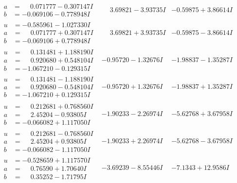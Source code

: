 \documentclass[1p]{elsarticle_modified}
\theoremstyle{definition}
\begin{document}
$$\begin{array}{c|c|c}
\begin{aligned}
a &= \phantom{-}0.071777 - 0.307147 I \\
b &= -0.069106 - 0.778948 I\end{aligned}
 & \phantom{-}3.69821 - 3.93735 I & -0.59875 + 3.86614 I \\ \hline\begin{aligned}
u &= -0.585961 - 1.027330 I \\
a &= \phantom{-}0.071777 + 0.307147 I \\
b &= -0.069106 + 0.778948 I\end{aligned}
 & \phantom{-}3.69821 + 3.93735 I & -0.59875 - 3.86614 I \\ \hline\begin{aligned}
u &= \phantom{-}0.131481 + 1.188190 I \\
a &= \phantom{-}0.920680 + 0.548104 I \\
b &= -1.067210 - 0.129315 I\end{aligned}
 & -0.95720 - 1.32676 I & -1.98837 - 1.35287 I \\ \hline\begin{aligned}
u &= \phantom{-}0.131481 - 1.188190 I \\
a &= \phantom{-}0.920680 - 0.548104 I \\
b &= -1.067210 + 0.129315 I\end{aligned}
 & -0.95720 + 1.32676 I & -1.98837 + 1.35287 I \\ \hline\begin{aligned}
u &= \phantom{-}0.212681 + 0.768560 I \\
a &= \phantom{-}2.45204 - 0.93805 I \\
b &= -0.066082 + 1.117050 I\end{aligned}
 & -1.90233 - 2.26974 I & -5.62768 + 3.67958 I \\ \hline\begin{aligned}
u &= \phantom{-}0.212681 - 0.768560 I \\
a &= \phantom{-}2.45204 + 0.93805 I \\
b &= -0.066082 - 1.117050 I\end{aligned}
 & -1.90233 + 2.26974 I & -5.62768 - 3.67958 I \\ \hline\begin{aligned}
u &= -0.528659 + 1.117570 I \\
a &= \phantom{-}0.76590 + 1.70640 I \\
b &= \phantom{-}0.35252 - 1.71795 I\end{aligned}
 & -3.69239 - 8.55446 I & -7.1343 + 12.9586 I \\ \hline\begin{aligned}

\end{aligned}
\end{array}$$
\end{document}

